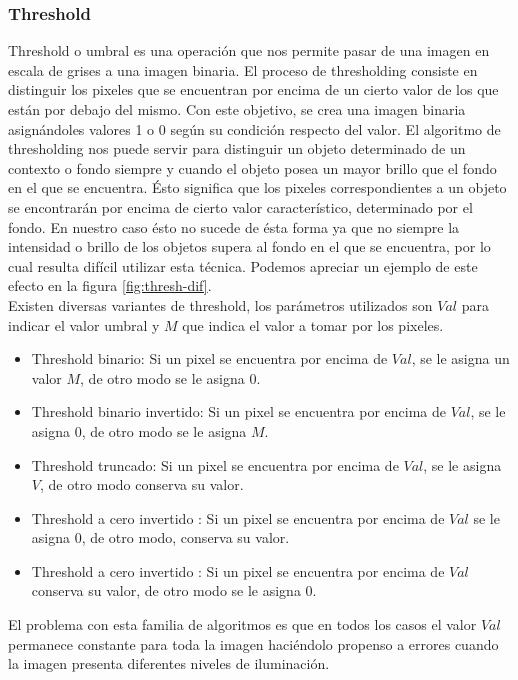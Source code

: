 	\subsubsection{\label{sec:thresh} Threshold}
Threshold o umbral es una operaci\'on que nos permite pasar de una 
imagen en escala de grises a una imagen binaria. El proceso de 
thresholding consiste en distinguir los pixeles que se encuentran por 
encima de un cierto valor de los que est\'an por debajo del mismo. Con 
este objetivo, se crea una imagen binaria asign\'andoles valores 1 o 0 
seg\'un su condici\'on respecto del valor. El algoritmo de thresholding 
nos puede servir para distinguir un objeto determinado de un contexto o 
fondo siempre y cuando el objeto posea un mayor brillo que el fondo en 
el que se encuentra. Ésto significa que los pixeles correspondientes a 
un objeto se encontrar\'an por encima de cierto valor caracter\'istico, 
determinado por el fondo. En nuestro caso \'esto no sucede de \'esta forma ya que no siempre la intensidad o brillo de los objetos supera al fondo en el que se encuentra, por lo cual resulta dif\'icil utilizar esta t\'ecnica. Podemos apreciar un ejemplo de este efecto en la figura \ref{fig:thresh-dif}. \\
\indent Existen diversas variantes de threshold, los par\'ametros 
utilizados son $Val$ para indicar el valor umbral y $M$ que indica el 
valor a tomar por los pixeles.
\begin{itemize}
\item{ Threshold binario:  Si un pixel se encuentra por encima de $Val$, se le asigna un valor $M$, de otro modo se le asigna $0$.}
\item{ Threshold binario invertido:  Si un pixel se encuentra por encima de $Val$, se le asigna 0, de otro modo se le asigna $M$.}
\item{ Threshold truncado:  Si un pixel se encuentra por encima de $Val$, se le asigna $V$, de otro modo conserva su valor.}
\item{ Threshold a cero invertido : Si un pixel se encuentra por encima de $Val$ se le asigna $0$, de otro modo, conserva su valor.}
\item{ Threshold a cero invertido : Si un pixel se encuentra por encima de $Val$ conserva su valor, de otro modo se le asigna $0$.}
\end{itemize}
El problema con esta familia de algoritmos es que en todos los casos el 
valor $Val$ permanece constante para toda la imagen haci\'endolo propenso 
a errores cuando la imagen presenta diferentes niveles de iluminaci\'on. 
